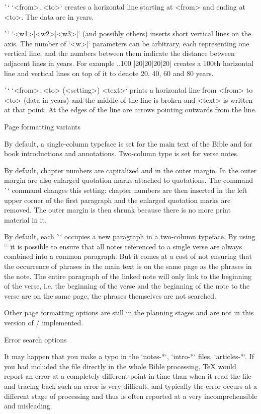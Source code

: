 {{{{{{{\`\tline` `<from>..<to>` creates a horizontal line starting at <from> and
ending at <to>. The data are in years.

\`\tlines` `<w1>|<w2>|<w3>|` (and possibly others) inserts short vertical lines on the axis.
The number of `<w>|` parameters can be arbitrary, each representing one
vertical line, and the numbers between them indicate the distance between adjacent lines in
years. For example
\begtt
{}..100
|20|20|20|20|
\endtt
creates a 100th horizontal line and vertical lines on top of it to denote 20,
40, 60 and 80 years.

\`\arrowtext` `<from>..<to> (<setting>) {<text>}`
prints a horizontal line from <from> to <to> (data in years)
and the middle of the line is broken and <text> is written at that point. At
the edges of the line are arrows pointing outwards from the line.


\sec Page formatting variants

By default, a single-column typeface is set for the main text of the Bible
and for book introductions and annotations. Two-column type is set for
verse notes.

By default, chapter numbers are capitalized and in the outer margin. In the outer margin are also
enlarged quotation marks attached to quotations. The command \`\normalchapnumbers`
command changes this setting: chapter numbers are then inserted in the left
upper corner of the first paragraph and the enlarged quotation marks are removed.
The outer margin is then shrunk because there is no more print material in it.  

By default, each \`\Note` occupies a new paragraph in a two-column
typeface. By using `\mergednotes` it is possible to ensure that all notes referenced
to a single verse are always combined into a common paragraph. But it comes at a cost
of not ensuring that the occurrence of phrases in the main text is on the same page
as the phrases in the note. The entire paragraph of the linked note will only link to
the beginning of the verse, i.e. the beginning of the verse and the beginning of the note to the verse are on the same
page, the phrases themselves are not searched.

Other page formatting options are still in the planning stages and are not in this version of \OpBible/
implemented.


\sec Error search options

It may happen that you make a typo in the `notes-*`, `intro-*` files,
`articles-*`. If you had included the file directly in the whole Bible processing,
TeX would report an error at a completely different point in time than when it read the file and
tracing back such an error is very difficult, and typically the error
occurs at a different stage of processing and thus is often reported at a very
incomprehensible and misleading.

}}}}}}}
